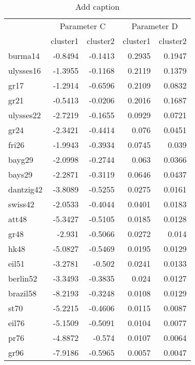 \begin{table}[htbp]
  \centering
  \caption{Add caption}
    \begin{tabular}{lrrrr}
          & \multicolumn{2}{c}{Parameter C} & \multicolumn{2}{c}{Parameter D} \\
          & \multicolumn{1}{l}{cluster1} & \multicolumn{1}{l}{cluster2} & \multicolumn{1}{l}{cluster1} & \multicolumn{1}{l}{cluster2} \\
    burma14 & -0.8494 & -0.1413 & 0.2935 & 0.1947 \\
    ulysses16 & -1.3955 & -0.1168 & 0.2119 & 0.1379 \\
    gr17  & -1.2914 & -0.6596 & 0.2109 & 0.0832 \\
    gr21  & -0.5413 & -0.0206 & 0.2016 & 0.1687 \\
    ulysses22 & -2.7219 & -0.1655 & 0.0929 & 0.0721 \\
    gr24  & -2.3421 & -0.4414 & 0.076 & 0.0451 \\
    fri26 & -1.9943 & -0.3934 & 0.0745 & 0.039 \\
    bayg29 & -2.0998 & -0.2744 & 0.063 & 0.0366 \\
    bays29 & -2.2871 & -0.3119 & 0.0646 & 0.0437 \\
    dantzig42 & -3.8089 & -0.5255 & 0.0275 & 0.0161 \\
    swiss42 & -2.0533 & -0.4044 & 0.0401 & 0.0183 \\
    att48 & -5.3427 & -0.5105 & 0.0185 & 0.0128 \\
    gr48  & -2.931 & -0.5066 & 0.0272 & 0.014 \\
    hk48  & -5.0827 & -0.5469 & 0.0195 & 0.0129 \\
    eil51 & -3.2781 & -0.502 & 0.0241 & 0.0133 \\
    berlin52 & -3.3493 & -0.3835 & 0.024 & 0.0127 \\
    brazil58 & -8.2193 & -0.3248 & 0.0108 & 0.0129 \\
    st70  & -5.2215 & -0.4606 & 0.0115 & 0.0087 \\
    eil76 & -5.1509 & -0.5091 & 0.0104 & 0.0077 \\
    pr76  & -4.8872 & -0.574 & 0.0107 & 0.0064 \\
    gr96  & -7.9186 & -0.5965 & 0.0057 & 0.0047 \\
    \end{tabular}%
  \label{tab:addlabel}%
\end{table}%
